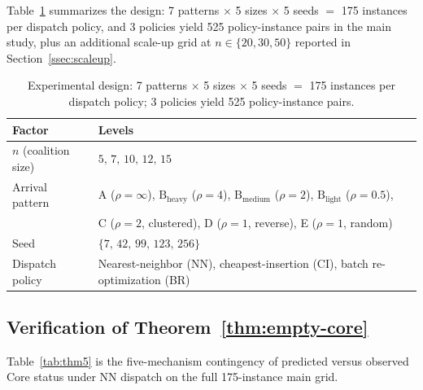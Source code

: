 \documentclass[11pt]{article}
\theoremstyle{plain}
\theoremstyle{definition}
\theoremstyle{remark}
\begin{document}
Table~\ref{tab:design} summarizes the design: 7 patterns $\times$ 5 sizes $\times$ 5 seeds $=$ 175 instances per dispatch policy, and 3 policies yield 525 policy-instance pairs in the main study, plus an additional scale-up grid at $n\in\{20,30,50\}$ reported in Section~\ref{ssec:scaleup}.

\begin{table}[t]
\centering
\caption{Experimental design: 7 patterns $\times$ 5 sizes $\times$ 5 seeds $=$ 175 instances per dispatch policy; 3 policies yield 525 policy-instance pairs.}
\label{tab:design}
\small
\begin{tabular}{@{}ll@{}}
\toprule
Factor & Levels \\
\midrule
$n$ (coalition size) & $5,\,7,\,10,\,12,\,15$ \\
Arrival pattern & A ($\rho=\infty$), $\text{B}_{\text{heavy}}$ ($\rho=4$), $\text{B}_{\text{medium}}$ ($\rho=2$), $\text{B}_{\text{light}}$ ($\rho=0.5$), \\
                & C ($\rho=2$, clustered), D ($\rho=1$, reverse), E ($\rho=1$, random) \\
Seed & $\{7,\,42,\,99,\,123,\,256\}$ \\
Dispatch policy & Nearest-neighbor (NN), cheapest-insertion (CI), batch re-optimization (BR) \\
\bottomrule
\end{tabular}
\end{table}

\subsection{Verification of Theorem~\ref{thm:empty-core}}

Table~\ref{tab:thm5} is the five-mechanism contingency of predicted versus observed Core status under NN dispatch on the full 175-instance main grid.
\end{document}
